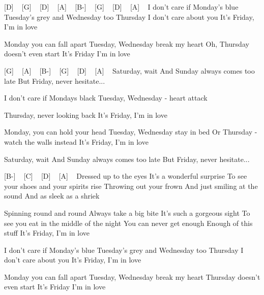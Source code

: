 
[D] ~ [G] ~ [D] ~ [A] ~ [B-] ~ [G] ~ [D] ~ [A] ~
I don't care if Monday's blue
Tuesday's grey and Wednesday too
Thursday I don't care about you
It's Friday, I'm in love

Monday you can fall apart
Tuesday, Wednesday break my heart
Oh, Thursday doesn't even start
It's Friday I'm in love


[G] ~ [A] ~ [B-] ~ [G] ~ [D] ~ [A] ~ 
Saturday, wait
And Sunday always comes too late
But Friday, never hesitate...

I don't care if Mondays black
Tuesday, Wednesday - heart attack

Thursday, never looking back
It's Friday, I'm in love

Monday, you can hold your head
Tuesday, Wednesday stay in bed
Or Thursday - watch the walls instead
It's Friday, I'm in love

Saturday, wait
And Sunday always comes too late
But Friday, never hesitate...


[B-] ~ [C] ~ [D] ~ [A] ~
Dressed up to the eyes
It's a wonderful surprise
To see your shoes and your spirits rise
Throwing out your frown
And just smiling at the sound
And as sleek as a shriek

Spinning round and round
Always take a big bite
It's such a gorgeous sight
To see you eat in the middle of the night
You can never get enough
Enough of this stuff
It's Friday, I'm in love

I don't care if Monday's blue
Tuesday's grey and Wednesday too
Thursday I don't care about you
It's Friday, I'm in love

Monday you can fall apart
Tuesday, Wednesday break my heart
Thursday doesn't even start
It's Friday I'm in love